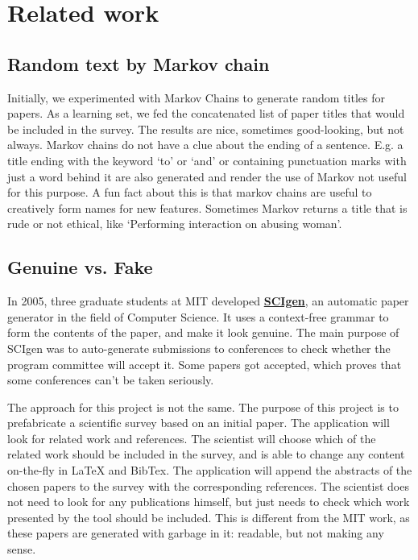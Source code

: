 \documentclass[12pt]{article}
\begin{document}
\section{Related work}

\subsection{Random text by Markov chain}
Initially, we experimented with Markov Chains to generate random titles for papers. As a learning set, we fed the concatenated list of paper titles that would be included in the survey. The results are nice, sometimes good-looking, but not always. Markov chains do not have a clue about the ending of a sentence. E.g. a title ending with the keyword `to' or `and' or containing punctuation marks with just a word behind it are also generated and render the use of Markov not useful for this purpose. A fun fact about this is that markov chains are useful to creatively form names for new features. Sometimes Markov returns a title that is rude or not ethical, like `Performing interaction on abusing woman'.


\subsection{Genuine vs. Fake}
In 2005, three graduate students at MIT developed \textbf{\href{http://pdos.csail.mit.edu/scigen/}{SCIgen}}, an automatic paper generator in the field of Computer Science. It uses a context-free grammar to form the contents of the paper, and make it look genuine. The main purpose of SCIgen was to auto-generate submissions to conferences to check whether the program committee will accept it. Some papers got accepted, which proves that some conferences can't be taken seriously.

The approach for this project is not the same. The purpose of this project is to prefabricate a scientific survey based on an initial paper. The application will look for related work and references. The scientist will choose which of the related work should be included in the survey, and is able to change any content on-the-fly in LaTeX and BibTex. The application will append the abstracts of the chosen papers to the survey with the corresponding references. The scientist does not need to look for any publications himself, but just needs to check which work presented by the tool should be included. This is different from the MIT work, as these papers are generated with garbage in it: readable, but not making any sense.
\end{document}
